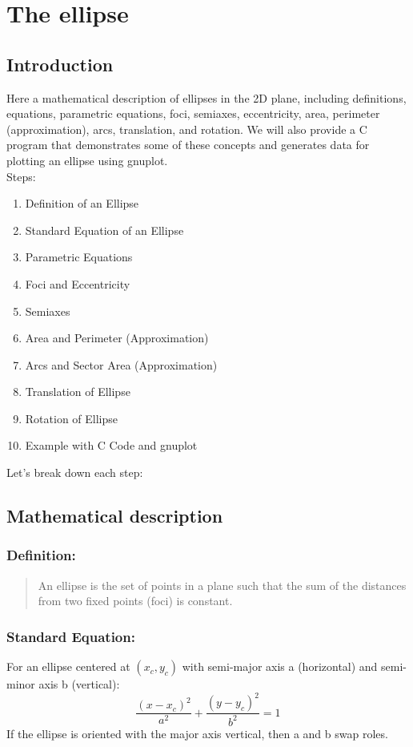 \documentclass[a4paper,14pt]{article}
\begin{document}
\section{The ellipse}
\subsection{Introduction}
Here a mathematical description of ellipses in the 2D plane, including definitions, equations, parametric equations, foci, semiaxes, eccentricity, area, perimeter (approximation), arcs, translation, and rotation. We will also provide a C program that demonstrates some of these concepts and generates data for plotting an ellipse using gnuplot.\\
Steps:\\
\begin{enumerate}
\item Definition of an Ellipse
\item Standard Equation of an Ellipse
\item Parametric Equations
\item Foci and Eccentricity
\item Semiaxes
\item Area and Perimeter (Approximation)
\item Arcs and Sector Area (Approximation)
\item Translation of Ellipse
\item Rotation of Ellipse
\item Example with C Code and gnuplot
\end{enumerate}
Let's break down each step:\\
\subsection{Mathematical description}
\subsubsection{Definition:}
\begin{quote}
    An ellipse is the set of points in a plane such that the sum of the distances from two fixed points (foci) is constant.
\end{quote}
\subsubsection{Standard Equation:}
For an ellipse centered at \((x_c, y_c)\) with semi-major axis a (horizontal) and semi-minor axis b (vertical):
      \[  \frac{(x - x_c)^2}{a^2} + \frac{(y - y_c)^2}{b^2} = 1 \]
    If the ellipse is oriented with the major axis vertical, then a and b swap roles.
\end{document}
